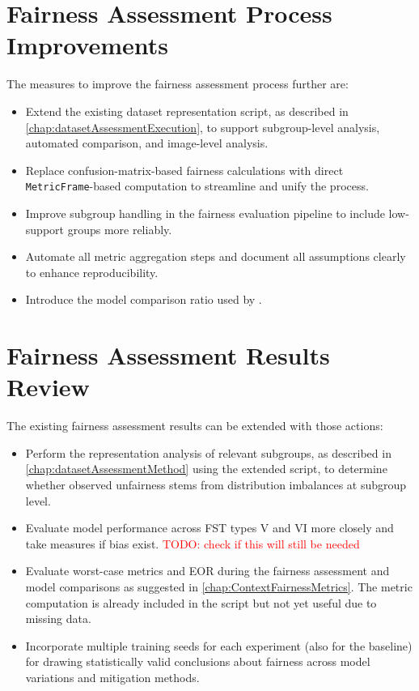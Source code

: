 \documentclass[12pt, a4paper, oneside]{book}   	%
\renewcommand{\todo}[1]{\textcolor{red}{TODO: #1}}
\begin{document}
		
		\section{Fairness Assessment Process Improvements}
		The measures to improve the fairness assessment process further are:
		\begin{itemize}
			\item Extend the existing dataset representation script, as described in \autoref{chap:datasetAssessmentExecution}, to support subgroup-level analysis, automated comparison, and image-level analysis.
			\item Replace confusion-matrix-based fairness calculations with direct \texttt{MetricFrame}-based computation to streamline and unify the process.
			\item Improve subgroup handling in the fairness evaluation pipeline to include low-support groups more reliably.
			\item Automate all metric aggregation steps and document all assumptions clearly to enhance reproducibility.
			\item Introduce the model comparison ratio used by \textcite{Valentim_2019}.
		\end{itemize}		
		
		\section{Fairness Assessment Results Review}
		The existing fairness assessment results can be extended with those actions:
		\begin{itemize}
			\item Perform the representation analysis of relevant subgroups, as described in \autoref{chap:datasetAssessmentMethod} using the extended script, to determine whether observed unfairness stems from distribution imbalances at subgroup level.	
			
			\item Evaluate model performance across \gls{FST} types V and VI more closely and take measures if bias exist. \todo{check if this will still be needed}
			
			\item Evaluate worst-case metrics and \gls{EOR} during the fairness assessment and model comparisons as suggested in \autoref{chap:ContextFairnessMetrics}. The metric computation is already included in the script but not yet useful due to missing data.
			
			\item Incorporate multiple training seeds for each experiment (also for the baseline) for drawing statistically valid conclusions about fairness across model variations and mitigation methods.
		\end{itemize}
		
\end{document}
